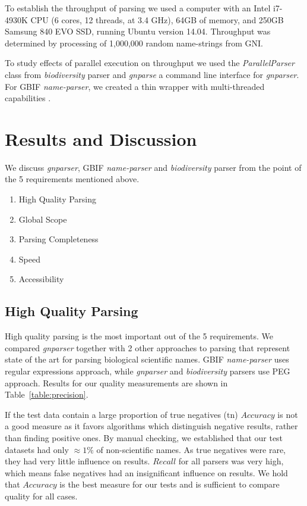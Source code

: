 \documentclass{bmcart}
\begin{document}
To establish the throughput of parsing we used a computer with an Intel i7-4930K
CPU (6 cores, 12 threads, at 3.4 GHz), 64GB of memory, and 250GB Samsung 840
EVO SSD, running Ubuntu version 14.04. Throughput was determined by processing
of 1,000,000 random name-strings from GNI.

To study effects of parallel execution on throughput we used the
\textit{ParallelParser} class from \textit{biodiversity} parser and
\textit{gnparse} a command line interface for \textit{gnparser}. For GBIF
\textit{name-parser}, we created a thin wrapper with multi-threaded
capabilities \cite{gbifparser}.

\section*{Results and Discussion}

We discuss \textit{gnparser}, GBIF \textit{name-parser} and
\textit{biodiversity} parser from the point of the 5 requirements mentioned
above.

\begin{enumerate}
  \item High Quality Parsing
  \item Global Scope
  \item Parsing Completeness
  \item Speed
  \item Accessibility
\end{enumerate}

\subsection*{High Quality Parsing}

High quality parsing is the most important out of the 5 requirements.  We
compared \textit{gnparser} together with 2 other approaches to parsing that
represent state of the art for parsing biological scientific names. GBIF
\textit{name-parser} uses regular expressions approach, while \textit{gnparser}
and \textit{biodiversity} parsers use PEG approach.   Results for our
quality measurements are shown in Table~\ref{table:precision}.

If the test data contain a large proportion of true negatives ($\text{tn}$)
$Accuracy$ is not a good measure as it favors algorithms which distinguish
negative results, rather than finding positive ones. By manual checking, we
established that our test datasets had only $\approx1\%$ of non-scientific
names. As true negatives were rare, they had very little influence on results.
$Recall$ for all parsers was very high, which means false negatives had an
insignificant influence on results. We hold that $Accuracy$ is the best measure
for our tests and is sufficient to compare quality for all cases.
\end{document}
